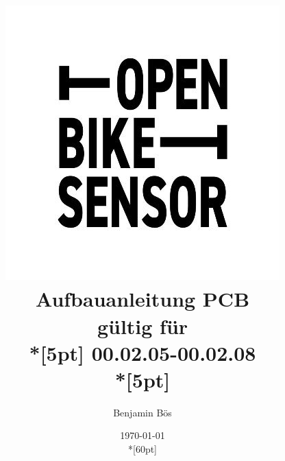 \documentclass[12pt, a4paper]{article}		%
\begin{document}
\title
{
  \includegraphics[scale=0.5]{Grafiken/OBS_Logo.jpg}\\
	

      \huge{\textbf
        {
        	Aufbauanleitung PCB\\
					}
					}
         gültig für\\*[5pt]
        00.02.05-00.02.08\\*[5pt]    
}

\author{Benjamin Bös}

\date{\today\\*[60pt]}



\maketitle         %
\thispagestyle{empty}

\newpage
\end{document}
